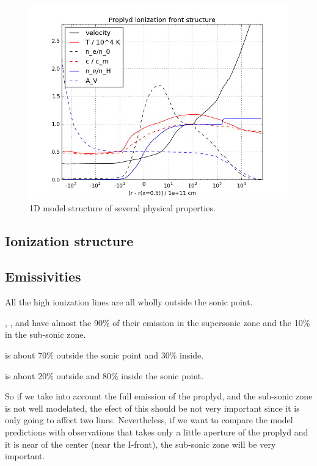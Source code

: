 \documentclass[useAMS,usenatbib]{mn2e}
\begin{document}
\begin{figure}
  \centering
  \includegraphics[width=8.5 cm]{ifrac-vs-Rlog.png}
  \caption{1D model structure of several physical properties.} \label{fig:ifrac}
\end{figure}

\subsection{Ionization structure}
\label{sec:ionization}



\subsection{Emissivities}
\label{sec:emi}

All the high ionization lines are all wholly outside the sonic point.

\neii, \ha, \nii and \oii have almost the 90\% of their emission in the supersonic zone and the 10\% in the sub-sonic zone.

\sii is about 70\% outside the sonic point and 30\% inside.

\oi is about 20\% outside and 80\% inside the sonic point.

So if we take into account the full emission of the proplyd, and the sub-sonic zone is not well modelated, the efect of this should be not very important since it is only going to affect two lines. Nevertheless, if we want to compare the model predictions with observations that takes only a little aperture of the proplyd and it is near of the center (near the I-front), the sub-sonic zone will be very important.
\end{document}
